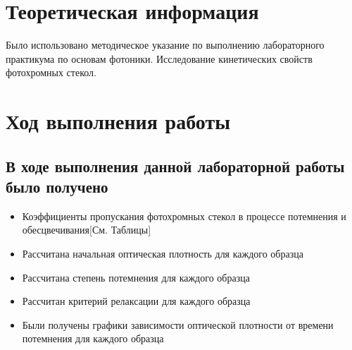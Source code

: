 

\section{Теоретическая информация}
    Было использовано методическое указание по выполнению лабораторного практикума по основам фотоники. Исследование кинетических свойств фотохромных стекол. \cite{conlan1983massive}

\section{Ход выполнения работы}

\subsection{В ходе выполнения данной лабораторной работы было получено}

\begin{itemize}
	\item Коэффициенты пропускания фотохромных стекол в процессе потемнения и обесцвечивания[См. Таблицы]
	\item Рассчитана начальная оптическая плотность для каждого образца
	\item Рассчитана степень потемнения для каждого образца
	\item Рассчитан критерий релаксации для каждого образца
	\item Были получены графики зависимости оптической плотности от времени потемнения для каждого образца
\end{itemize}


